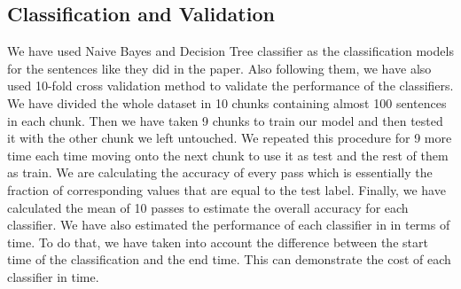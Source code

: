 \subsection{Classification and Validation}
We have used Naive Bayes and Decision Tree classifier as the classification models for the sentences like they did in the paper. Also following them, we have also used 10-fold cross validation method to validate the performance of the classifiers. We have divided the whole dataset in 10 chunks containing almost 100 sentences in each chunk. Then we have taken 9 chunks to train our model and then tested it with the other chunk we left untouched. We repeated this procedure for 9 more time each time moving onto the next chunk to use it as test and the rest of them as train. We are calculating the accuracy of every pass which is essentially the fraction of corresponding values that are equal to the test label. Finally, we have calculated the mean of 10 passes to estimate the overall accuracy for each classifier. We have also estimated the performance of each classifier in in terms of time. To do that, we have taken into account the difference between the start time of the classification and the end time. This can demonstrate the cost of each classifier in time.